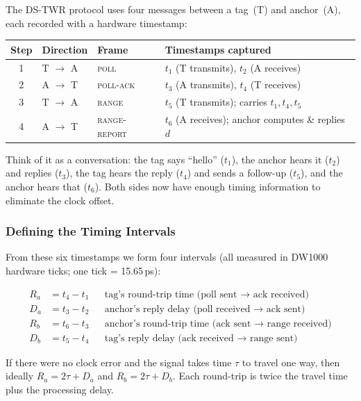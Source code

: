 \documentclass[11pt,a4paper]{article}
\begin{document}
The DS-TWR protocol uses four messages between a tag~(T) and anchor~(A), each recorded with a hardware timestamp:

\begin{center}
\begin{tabular}{clll}
\toprule
\textbf{Step} & \textbf{Direction} & \textbf{Frame} & \textbf{Timestamps captured} \\
\midrule
1 & T $\to$ A & \textsc{poll}         & $t_1$ (T transmits), $t_2$ (A receives) \\
2 & A $\to$ T & \textsc{poll-ack}     & $t_3$ (A transmits), $t_4$ (T receives) \\
3 & T $\to$ A & \textsc{range}        & $t_5$ (T transmits); carries $t_1, t_4, t_5$ \\
4 & A $\to$ T & \textsc{range-report} & $t_6$ (A receives); anchor computes \& replies $d$ \\
\bottomrule
\end{tabular}
\end{center}

Think of it as a conversation: the tag says ``hello'' ($t_1$), the anchor hears it ($t_2$) and replies ($t_3$), the tag hears the reply ($t_4$) and sends a follow-up ($t_5$), and the anchor hears that ($t_6$). Both sides now have enough timing information to eliminate the clock offset.

\subsubsection{Defining the Timing Intervals}

From these six timestamps we form four intervals (all measured in DW1000 hardware ticks; one tick = 15.65\,ps):

\begin{align}
R_a &= t_4 - t_1 & &\text{tag's round-trip time (poll sent $\to$ ack received)} \\
D_a &= t_3 - t_2 & &\text{anchor's reply delay (poll received $\to$ ack sent)} \\
R_b &= t_6 - t_3 & &\text{anchor's round-trip time (ack sent $\to$ range received)} \\
D_b &= t_5 - t_4 & &\text{tag's reply delay (ack received $\to$ range sent)}
\end{align}

If there were no clock error and the signal takes time $\tau$ to travel one way, then ideally $R_a = 2\tau + D_a$ and $R_b = 2\tau + D_b$. Each round-trip is twice the travel time plus the processing delay.
\end{document}
